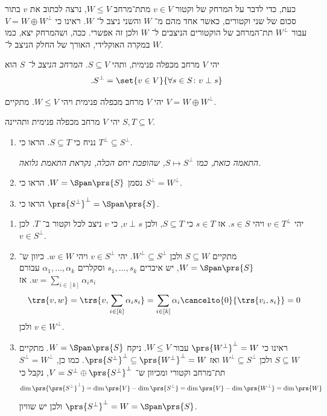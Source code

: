 \documentclass[a4paper,10pt,twoside,openany]{book}
\begin{document}
כעת, כדי לדבר על המרחק של וקטור
$v \in V$
מתת־מרחב
$W \leq V$,
נרצה לכתוב את
$v$
בתור סכום של שני וקטורים, כאשר אחד מהם מ־%
$W$
והשני ניצב ל־%
$W$.
ראינו כי
$V = W \oplus W^{\perp}$
עבור
$W^\perp$
תת־המרחב של הוקטורים הניצבים ל־%
$W$
ולכן זה אפשרי.
ככה, ושהמרחק יצא, כמו במקרה האוקלידי, האורך של החלק הניצב ל־%
$W$.

\begin{definition}
יהי
$V$
מרחב מכפלה פנימית, ותהי
$S \subseteq V$.
\emph{המרחב הניצב ל־%
$S$}
הוא
\[\text{.} S^\perp = \set{v \in V}{\forall s \in S \colon v \perp s}\]
\end{definition}

\begin{proposition}
יהי
$V$
מרחב מכפלה פנימית ויהי
$W \leq V$.
מתקיים
$V = W \oplus W^\perp$.
\end{proposition}

\begin{exercisechap}
יהי
$V$
מרחב מכפלה פנימית ותהיינה
$S,T \subseteq V$.

\begin{enumerate}
\item 
נניח כי
$S \subseteq T$.
הראו כי
$T^\perp \subseteq S^\perp$.

\emph{התאמה כזאת, כמו $S \mapsto S^\perp$, שהופכת יחס הכלה, נקראת
\emph{התאמת גלואה}.}

\item
נסמן
$W = \Span\prs{S}$.
הראו כי
$S^\perp = W^\perp$.

\item
הראו כי
$\prs{S^{\perp}}^\perp = \Span\prs{S}$.
\end{enumerate}
\end{exercisechap}

\begin{solution}
\begin{enumerate}
\item
יהי
$v \in T^\perp$
ויהי
$s \in S$.
אז
$s \in T$
כי
$S \subseteq T$,
ולכן
$v \perp s$,
כי
$v$
ניצב לכל וקטור ב־%
$T$.
לכן
$v \in S^\perp$.

\item
מתקיים
$S \subseteq W$
ולכן
$W^\perp \subseteq S^\perp$.
יהי
$v \in S^\perp$
ויהי
$w \in W$.
כיוון ש־%
$W = \Span\prs{S}$,
יש איברים
$s_1, \ldots, s_k$
וסקלרים
$\alpha_1, \ldots, \alpha_k$
עבורם
$w = \sum_{i \in [k]} \alpha_i s_i$.
אז
\[\trs{v,w} = \trs{v, \sum_{i \in [k]} \alpha_i s_i} = \sum_{i \in [k]} \alpha_i \cancelto{0}{\trs{v_i, s_i}} = 0\]
ולכן
$v \in W^\perp$.

\item
ראינו כי
$\prs{W^\perp}^\perp = W$
עבור
$W \leq V$.
ניקח
$W = \Span\prs{S}$.
מתקיים
$S \subseteq W$
ולכן
$W^\perp \subseteq S^\perp$
ואז
$\prs{S^\perp}^\perp \subseteq \prs{W^\perp}^\perp = W$.
כמו כן,
$S^\perp = W^\perp$
תת־מרחב וקטורי ומכיוון ש־%
$V = S^\perp \oplus \prs{S^\perp}^\perp$,
נקבל כי
\[\dim\prs{\prs{S^\perp}^\perp} = \dim\prs{V} - \dim\prs{S^\perp} = \dim\prs{V} - \dim\prs{W^\perp} = \dim\prs{W}\]
ולכן יש שוויון
$\prs{S^\perp}^\perp = W = \Span\prs{S}$.
\end{enumerate}
\end{solution}
\end{document}
